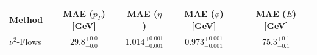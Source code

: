     \begin{tabular}{lcccc}
        \toprule
        Method & MAE ($p_T$) [GeV] & MAE ($\eta$) & MAE ($\phi$) [GeV] & MAE ($E$) [GeV] \\
        \midrule
        $\nu^2$-Flows & $29.8_{-0.0}^{+0.0}$ & $1.014_{-0.001}^{+0.001}$ & $0.973_{-0.001}^{+0.001}$ & $75.3_{-0.1}^{+0.1}$ \\
        \bottomrule
    \end{tabular}